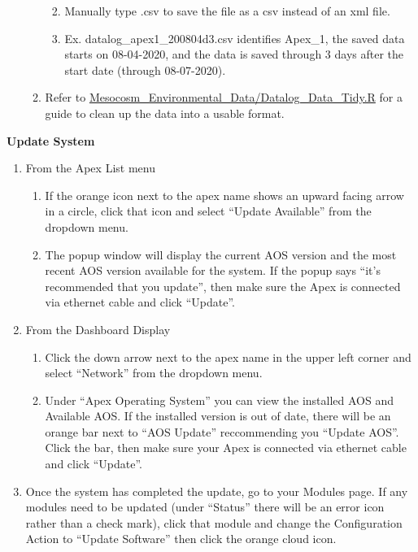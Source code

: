 \documentclass[
]{book}
\providecommand{\tightlist}{%
  \setlength{\itemsep}{0pt}\setlength{\parskip}{0pt}}
\begin{document}
\begin{enumerate}
\begin{enumerate}
    \begin{enumerate}
    \def\labelenumiii{\arabic{enumiii}.}
    \tightlist
    \item
      Manually type .csv to save the file as a csv instead of an xml file.
    \item
      Ex. datalog\_apex1\_200804d3.csv identifies Apex\_1, the saved data starts on 08-04-2020, and the data is saved through 3 days after the start date (through 08-07-2020).
    \end{enumerate}
  \item
    Refer to \href{https://github.com/SilbigerLab/Mesocosm_Environmental_Data/blob/master/Scripts/Datalog_Data_Tidy.R}{Mesocosm\_Environmental\_Data/Datalog\_Data\_Tidy.R} for a guide to clean up the data into a usable format.
  \end{enumerate}
\end{enumerate}

\textbf{Update System}

\begin{enumerate}
\def\labelenumi{\arabic{enumi}.}
\tightlist
\item
  From the Apex List menu

  \begin{enumerate}
  \def\labelenumii{\arabic{enumii}.}
  \tightlist
  \item
    If the orange icon next to the apex name shows an upward facing arrow in a circle, click that icon and select ``Update Available'' from the dropdown menu.
  \item
    The popup window will display the current AOS version and the most recent AOS version available for the system. If the popup says ``it's recommended that you update'', then make sure the Apex is connected via ethernet cable and click ``Update''.
  \end{enumerate}
\item
  From the Dashboard Display

  \begin{enumerate}
  \def\labelenumii{\arabic{enumii}.}
  \tightlist
  \item
    Click the down arrow next to the apex name in the upper left corner and select ``Network'' from the dropdown menu.
  \item
    Under ``Apex Operating System'' you can view the installed AOS and Available AOS. If the installed version is out of date, there will be an orange bar next to ``AOS Update'' reccommending you ``Update AOS''. Click the bar, then make sure your Apex is connected via ethernet cable and click ``Update''.
  \end{enumerate}
\item
  Once the system has completed the update, go to your Modules page. If any modules need to be updated (under ``Status'' there will be an error icon rather than a check mark), click that module and change the Configuration Action to ``Update Software'' then click the orange cloud icon.
\end{enumerate}
\end{document}
